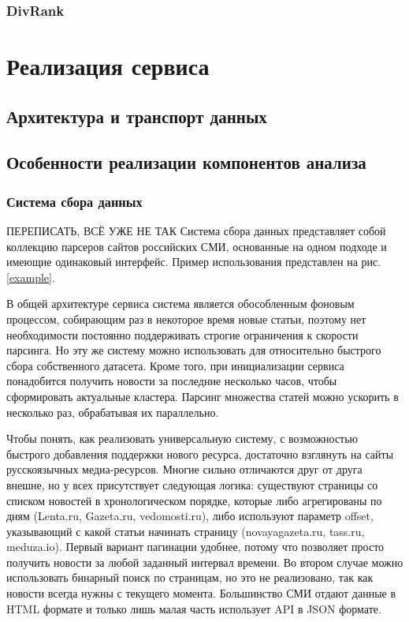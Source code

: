 \documentclass[a4paper, 14pt]{extarticle}
\begin{document}
\subsubsection{DivRank}


\section{Реализация сервиса}
\subsection{Архитектура и транспорт данных}
\subsection{Особенности реализации компонентов анализа}
\subsubsection{Система сбора данных}

{\LARGE ПЕРЕПИСАТЬ, ВСЁ УЖЕ НЕ ТАК}
Система сбора данных представляет собой коллекцию парсеров сайтов российских СМИ, основанные на одном подходе и имеющие одинаковый интерфейс. Пример использования представлен на рис. \ref{example}.

В общей архитектуре сервиса система является обособленным фоновым процессом, собирающим раз в некоторое время новые статьи, поэтому нет необходимости постоянно поддерживать строгие ограничения к скорости парсинга. Но эту же систему можно использовать для относительно быстрого сбора собственного датасета. Кроме того, при инициализации сервиса понадобится получить новости за последние несколько часов, чтобы сформировать актуальные кластера. Парсинг множества статей можно ускорить в несколько раз, обрабатывая их параллельно.

Чтобы понять, как реализовать универсальную систему, с возможностью быстрого добавления поддержки нового ресурса, достаточно взглянуть на сайты русскоязычных медиа-ресурсов. Многие сильно отличаются друг от друга внешне, но у всех присутствует следующая логика: существуют страницы со списком новостей в хронологическом порядке, которые либо агрегированы по дням (Lenta.ru, Gazeta.ru, vedomosti.ru), либо используют параметр offset, указывающий с какой статьи начинать страницу (novayagazeta.ru, tass.ru, meduza.io). Первый вариант пагинации удобнее, потому что позволяет просто получить новости за любой заданный интервал времени. Во втором случае можно использовать бинарный поиск по страницам, но это не реализовано, так как новости всегда нужны с текущего момента.
Большинство СМИ отдают данные в HTML формате и только лишь малая часть использует API в JSON формате.
\end{document}

